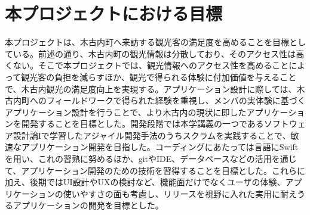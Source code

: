 \section{本プロジェクトにおける目標}

本プロジェクトは、木古内町へ来訪する観光客の満足度を高めることを目標としている。前述の通り、木古内町の観光情報は分散しており、そのアクセス性は高くない。そこで本プロジェクトでは、観光情報へのアクセス性を高めることによって観光客の負担を減らすほか、観光で得られる体験に付加価値を与えることで、木古内観光の満足度向上を実現する。アプリケーション設計に際しては、木古内町へのフィールドワークで得られた経験を重視し、メンバの実体験に基づくアプリケーション設計を行うことで、より木古内の現状に即したアプリケーションを開発することを目標とした。開発段階では本学講義の一つであるソフトウェア設計論Iで学習したアジャイル開発手法のうちスクラムを実践することで、敏速なアプリケーション開発を目指した。コーディングにあたっては言語にSwiftを用い、これの習熟に努めるほか、gitやIDE、データベースなどの活用を通じて、アプリケーション開発のための技術を習得することを目標とした。これらに加え、後期ではUI設計やUXの検討など、機能面だけでなくユーザの体験、アプリケーションの使いやすさの面も考慮し、リリースを視野に入れた実用に耐えうるアプリケーションの開発を目標とした。


